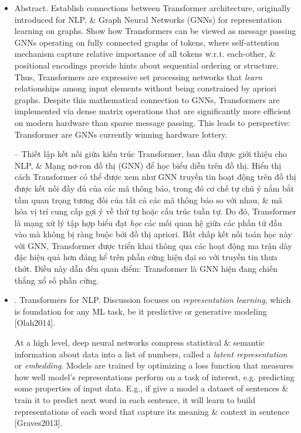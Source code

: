 \documentclass{article}
\begin{document}
\begin{itemize}
    \item {\sf Abstract.} Establish connections between Transformer architecture, originally introduced for NLP, \& Graph Neural Networks (GNNs) for representation learning on graphs. Show how Transformers can be viewed as message passing GNNs operating on fully connected graphs of tokens, where self-attention mechanism capture relative importance of all tokens w.r.t. each-other, \& positional encodings provide hints about sequential ordering or structure. Thus, Transformers are expressive set processing networks that {\it learn} relationships among input elements without being constrained by apriori graphs. Despite this mathematical connection to GNNs, Transformers are implemented via dense matrix operations that are significantly more efficient on modern hardware than sparse message passing. This leads to perspective: Transformer are GNNs currently winning hardware lottery.

    -- Thiết lập kết nối giữa kiến trúc Transformer, ban đầu được giới thiệu cho NLP, \& Mạng nơ-ron đồ thị (GNN) để học biểu diễn trên đồ thị. Hiển thị cách Transformer có thể được xem như GNN truyền tin hoạt động trên đồ thị được kết nối đầy đủ của các mã thông báo, trong đó cơ chế tự chú ý nắm bắt tầm quan trọng tương đối của tất cả các mã thông báo so với nhau, \& mã hóa vị trí cung cấp gợi ý về thứ tự hoặc cấu trúc tuần tự. Do đó, Transformer là mạng xử lý tập hợp biểu đạt {\it học} các mối quan hệ giữa các phần tử đầu vào mà không bị ràng buộc bởi đồ thị apriori. Bất chấp kết nối toán học này với GNN, Transformer được triển khai thông qua các hoạt động ma trận dày đặc hiệu quả hơn đáng kể trên phần cứng hiện đại so với truyền tin thưa thớt. Điều này dẫn đến quan điểm: Transformer là GNN hiện đang chiến thắng xổ số phần cứng.
    \item {. Transformers for NLP.} Discussion focuses on {\it representation learning}, which is foundation for any ML task, be it predictive or generative modeling [Olah2014].

    At a high level, deep neural networks compress statistical \& semantic information about data into a list of numbers, called a {\it latent representation} or {\it embedding}. Models are trained by optimizing a loss function that measures how well model's representations perform on a task of interest, e.g. predicting some properties of input data. E.g., if give a model a dataset of sentences \& train it to predict next word in each sentence, it will learn to build representations of each word that capture its meaning \& context in sentence [Graves2013].


\end{itemize}
\end{document}
